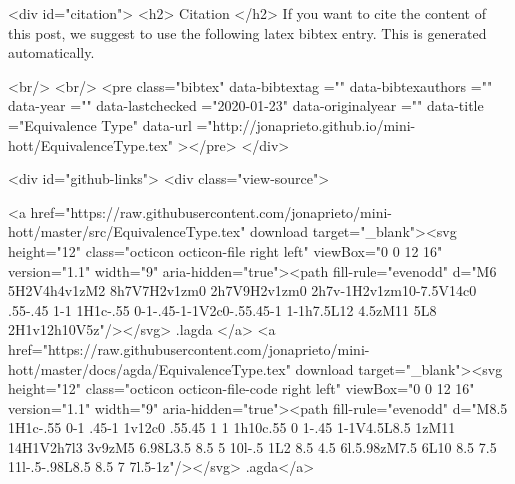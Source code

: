   
  <div id="citation">
  <h2> Citation </h2>
  If you want to cite the content of this post,
  we suggest to use the following latex bibtex entry.
  This is generated automatically.

  <br/>
  <br/>
  <pre class="bibtex"
       data-bibtextag =""
       data-bibtexauthors =""
       data-year =""
       data-lastchecked ="2020-01-23"
       data-originalyear =""
       data-title ="Equivalence Type"
       data-url ="http://jonaprieto.github.io/mini-hott/EquivalenceType.tex"
  ></pre>
  </div>
  

  <div id="github-links">
    <div class="view-source">
      
        <a href="https://raw.githubusercontent.com/jonaprieto/mini-hott/master/src/EquivalenceType.tex" download target="_blank"><svg height="12" class="octicon octicon-file right left" viewBox="0 0 12 16" version="1.1" width="9" aria-hidden="true"><path fill-rule="evenodd" d="M6 5H2V4h4v1zM2 8h7V7H2v1zm0 2h7V9H2v1zm0 2h7v-1H2v1zm10-7.5V14c0 .55-.45 1-1 1H1c-.55 0-1-.45-1-1V2c0-.55.45-1 1-1h7.5L12 4.5zM11 5L8 2H1v12h10V5z"/></svg> .lagda </a>
        <a href="https://raw.githubusercontent.com/jonaprieto/mini-hott/master/docs/agda/EquivalenceType.tex" download target="_blank"><svg height="12" class="octicon octicon-file-code right left" viewBox="0 0 12 16" version="1.1" width="9" aria-hidden="true"><path fill-rule="evenodd" d="M8.5 1H1c-.55 0-1 .45-1 1v12c0 .55.45 1 1 1h10c.55 0 1-.45 1-1V4.5L8.5 1zM11 14H1V2h7l3 3v9zM5 6.98L3.5 8.5 5 10l-.5 1L2 8.5 4.5 6l.5.98zM7.5 6L10 8.5 7.5 11l-.5-.98L8.5 8.5 7 7l.5-1z"/></svg> .agda</a>
      
